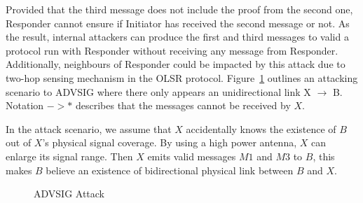 Provided that the third message does not include the proof from the second one, Responder cannot ensure if Initiator has received the second message or not. As the result, internal attackers can produce the first and third messages to valid a protocol run with Responder without receiving any message from Responder. Additionally,  neighbours of Responder could be impacted by this attack due to two-hop sensing mechanism in the OLSR protocol.  Figure~\ref{advsigattack3} outlines an attacking scenario to ADVSIG where there only appears an unidirectional link X $\rightarrow$ B. Notation $->*$ describes that the messages cannot be received by $X$. 

In the attack scenario, we assume that $X$ accidentally knows the existence of $B$ out of $X$'s physical signal coverage. By using a high power antenna, $X$ can enlarge its signal range. Then $X$ emits valid messages $M1$ and $M3$ to $B$, this makes $B$ believe an existence of bidirectional physical link between $B$ and $X$.  

\begin{figure}
		\caption{ADVSIG Attack }\label{advsigattack3}
        \centering

	    \centering

\end{figure}

